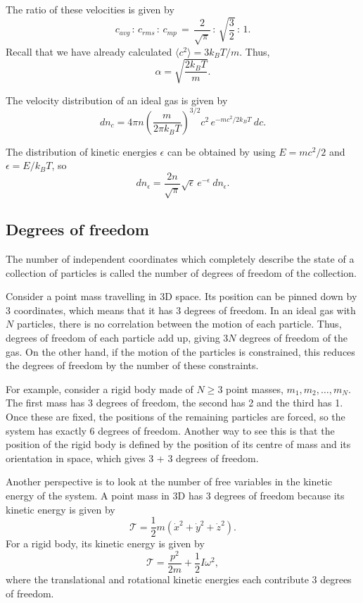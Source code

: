 \documentclass[11pt]{article}
\newcommand\E[1]{\langle #1 \rangle}
\theoremstyle{definition}
\theoremstyle{remark}
\numberwithin{equation}{section}
\begin{document}
    The ratio of these velocities is given by \[
        c_{avg} \,:\, c_{rms} \,:\, c_{mp} \,=\, 
            \frac{2}{\sqrt{\pi}} \,:\, \sqrt{\frac{3}{2}} \,:\, 1.
    \] Recall that we have already calculated $\E{c^2} = 3 k_B T /m$. Thus, \[
        \alpha = \sqrt{\frac{2k_B T}{m}}.
    \]
    \begin{theorem}
        The velocity distribution of an ideal gas is given by \[
            dn_c = 4\pi n\left( \frac{m}{2\pi k_B T} \right)^{3 /2} c^2\, e^{-mc^2 /
            2k_B T} \:dc.
        \] 
    \end{theorem}
    The distribution of kinetic energies $\epsilon$ can be obtained by using $E =
    mc^2 / 2$ and $\epsilon = E / k_B T$, so \[
        dn_\epsilon = \frac{2n}{\sqrt{\pi}}\sqrt{\epsilon}\,
        e^{-\epsilon}\:dn_\epsilon.
    \] 


    \subsection{Degrees of freedom}
    \begin{definition}
        The number of independent coordinates which completely describe the state of
        a collection of particles is called the number of degrees of freedom of the
        collection.
    \end{definition}

    Consider a point mass travelling in 3D space. Its position can be pinned down by
    3 coordinates, which means that it has 3 degrees of freedom. In an ideal gas
    with $N$ particles, there is no correlation between the motion of each particle.
    Thus, degrees of freedom of each particle add up, giving $3N$ degrees of freedom
    of the gas. On the other hand, if the motion of the particles is constrained,
    this reduces the degrees of freedom by the number of these constraints.

    For example, consider a rigid body made of $N \geq 3$ point masses, $m_1, m_2,
    \dots, m_N$. The first mass has 3 degrees of freedom, the second has 2 and the
    third has 1. Once these are fixed, the positions of the remaining particles are
    forced, so the system has exactly 6 degrees of freedom. Another way to see this
    is that the position of the rigid body is defined by the position of its centre
    of mass and its orientation in space, which gives 3 + 3 degrees of freedom.
    
    Another perspective is to look at the number of free variables in the kinetic
    energy of the system. A point mass in 3D has 3 degrees of freedom because its
    kinetic energy is given by \[
        \mathscr{T} = \frac{1}{2}m(\dot{x}^2 + \dot{y}^2 + \dot{z}^2).
    \] For a rigid body, its kinetic energy is given by \[
        \mathscr{T} = \frac{p^2}{2m} + \frac{1}{2}I\omega^2,
    \] where the translational and rotational kinetic energies each contribute 3
    degrees of freedom.
\end{document}
